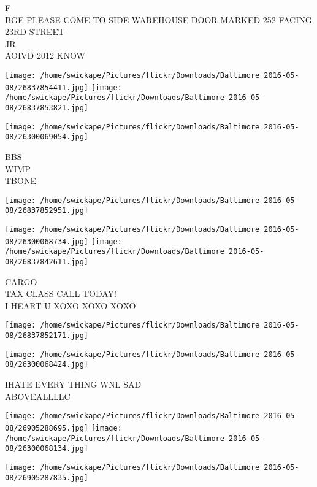 \documentclass[10pt,letterpaper]{article}
\begin{document}
F\\
BGE PLEASE COME TO SIDE WAREHOUSE DOOR MARKED 252 FACING 23RD STREET\\
JR\\
AOIVD 2012 KNOW\\
\pagebreak

\texttt{[image: /home/swickape/Pictures/flickr/Downloads/Baltimore 2016-05-08/26837854411.jpg]}
\texttt{[image: /home/swickape/Pictures/flickr/Downloads/Baltimore 2016-05-08/26837853821.jpg]}

\texttt{[image: /home/swickape/Pictures/flickr/Downloads/Baltimore 2016-05-08/26300069054.jpg]}

BBS\\
WIMP\\
TBONE\\
\pagebreak

\texttt{[image: /home/swickape/Pictures/flickr/Downloads/Baltimore 2016-05-08/26837852951.jpg]}

\vspace{0.25in}
\texttt{[image: /home/swickape/Pictures/flickr/Downloads/Baltimore 2016-05-08/26300068734.jpg]}
\texttt{[image: /home/swickape/Pictures/flickr/Downloads/Baltimore 2016-05-08/26837842611.jpg]}

CARGO\\
TAX CLASS CALL TODAY!\\
I HEART U XOXO XOXO XOXO\\
\pagebreak

\texttt{[image: /home/swickape/Pictures/flickr/Downloads/Baltimore 2016-05-08/26837852171.jpg]}

\vspace{0.25in}
\texttt{[image: /home/swickape/Pictures/flickr/Downloads/Baltimore 2016-05-08/26300068424.jpg]}

IHATE EVERY THING WNL SAD\\
ABOVEALLLLC\\
\pagebreak

\texttt{[image: /home/swickape/Pictures/flickr/Downloads/Baltimore 2016-05-08/26905288695.jpg]}
\texttt{[image: /home/swickape/Pictures/flickr/Downloads/Baltimore 2016-05-08/26300068134.jpg]}

\vspace{0.25in}
\texttt{[image: /home/swickape/Pictures/flickr/Downloads/Baltimore 2016-05-08/26905287835.jpg]}
\end{document}
